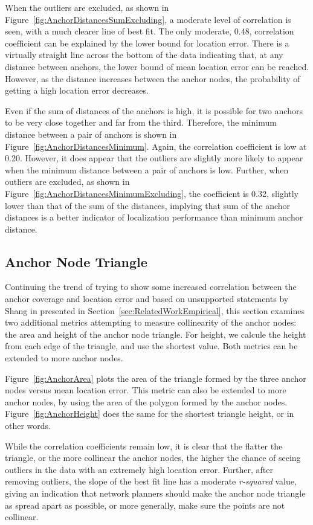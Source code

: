 When the outliers are excluded, as shown in Figure~\ref{fig:AnchorDistancesSumExcluding}, a moderate level of correlation is seen, with a much clearer line of best fit.  The only moderate, 0.48, correlation coefficient can be explained by the lower bound for location error.  There is a virtually straight line across the bottom of the data indicating that, at any distance between anchors, the lower bound of mean location error can be reached.  However, as the distance increases between the anchor nodes, the probability of getting a high location error decreases.

Even if the sum of distances of the anchors is high, it is possible for two anchors to be very close together and far from the third.  Therefore, the minimum distance between a pair of anchors is shown in Figure~\ref{fig:AnchorDistancesMinimum}.  Again, the correlation coefficient is low at 0.20.  However, it does appear that the outliers are slightly more likely to appear when the minimum distance between a pair of anchors is low.  Further, when outliers are excluded, as shown in Figure~\ref{fig:AnchorDistancesMinimumExcluding}, the coefficient is 0.32, slightly lower than that of the sum of the distances, implying that sum of the anchor distances is a better indicator of localization performance than minimum anchor distance.

\subsection{Anchor Node Triangle}
\label{sec:anchorTriangle}
Continuing the trend of trying to show some increased correlation between the anchor coverage and location error and based on unsupported statements by Shang in \cite[p. 964]{MDS-MAP} presented in Section~\ref{sec:RelatedWorkEmpirical}, this section examines two additional metrics attempting to measure collinearity of the anchor nodes: the area and height of the anchor node triangle.  For height, we calcule the height from each edge of the triangle, and use the shortest value.  Both metrics can be extended to more anchor nodes.

Figure~\ref{fig:AnchorArea} plots the area of the triangle formed by the three anchor nodes versus mean location error.  This metric can also be extended to more anchor nodes, by using the area of the polygon formed by the anchor nodes.  Figure~\ref{fig:AnchorHeight} does the same for the shortest triangle height, or in other words.

While the correlation coefficients remain low, it is clear that the flatter the triangle, or the more collinear the anchor nodes, the higher the chance of seeing outliers in the data with an extremely high location error. Further, after removing outliers, the slope of the best fit line has a moderate \emph{r-squared} value, giving an indication that network planners should make the anchor node triangle as spread apart as possible, or more generally, make sure the points are not collinear.

